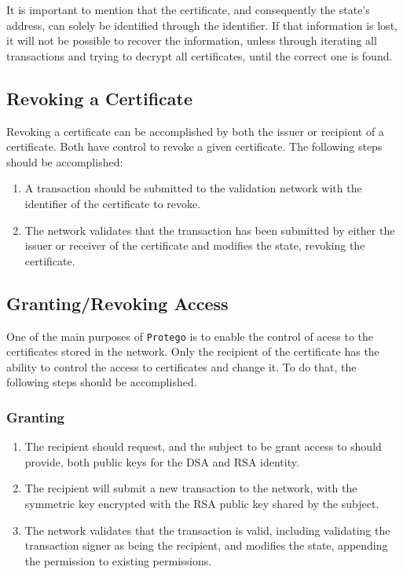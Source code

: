 It is important to mention that the certificate, and consequently the state's address, can solely be identified through the identifier. If that information is lost, it will not be possible to recover the information, unless through iterating all transactions and trying to decrypt all certificates, until the correct one is found.

\subsection{Revoking a Certificate}

Revoking a certificate can be accomplished by both the issuer or recipient of a certificate. Both have control to revoke a given certificate. The following steps should be accomplished:

\begin{enumerate}
	\item A transaction should be submitted to the validation network with the identifier of the certificate to revoke.
	\item The network validates that the transaction has been submitted by either the issuer or receiver of the certificate and modifies the state, revoking the certificate.
\end{enumerate}

\subsection{Granting/Revoking Access}

One of the main purposes of \texttt{Protego} is to enable the control of acess to the certificates stored in the network. Only the recipient of the certificate has the ability to control the access to certificates and change it. To do that, the following steps should be accomplished.

\subsubsection{Granting}

\begin{enumerate}
    \item The recipient should request, and the subject to be grant access to should provide, both public keys for the DSA and RSA identity.
    \item The recipient will submit a new transaction to the network, with the symmetric key encrypted with the RSA public key shared by the subject.
    \item The network validates that the transaction is valid, including validating the transaction signer as being the recipient, and modifies the state, appending the permission to existing permissions.
\end{enumerate}

